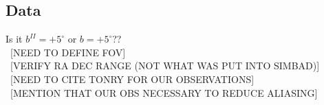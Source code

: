 \documentclass[aps,prb,twocolumn,superscriptaddress]{revtex4-1}
\begin{document}
\subsection{Data}\label{sec:data}

Is it $b^{II}=+5^{\circ}$ or $b=+5^{\circ}$??\\
~[NEED TO DEFINE FOV]\\
~[VERIFY RA DEC RANGE (NOT WHAT WAS PUT INTO SIMBAD)]\\
~[NEED TO CITE TONRY FOR OUR OBSERVATIONS]\\
~[MENTION THAT OUR OBS NECESSARY TO REDUCE ALIASING]\\
\end{document}
